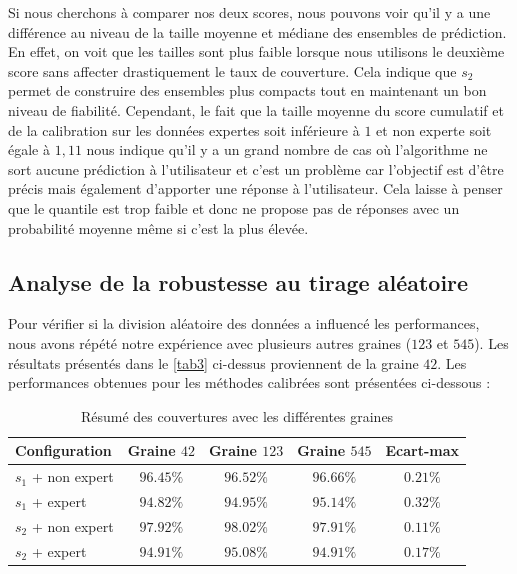 \documentclass[a4paper,12pt]{article}
\begin{document}
\vspace{0.2cm}

Si nous cherchons à comparer nos deux scores, nous pouvons voir qu'il y a une différence au niveau de la taille moyenne et médiane des ensembles de prédiction. En effet, on voit que les tailles sont plus faible lorsque nous utilisons le deuxième score sans affecter drastiquement le taux de couverture. Cela indique que $s_2$ permet de construire des ensembles plus compacts tout en maintenant un bon niveau de fiabilité. Cependant, le fait que la taille moyenne du score cumulatif et de la calibration sur les données expertes soit inférieure à $1$ et non experte soit égale à $1,11$ nous indique qu'il y a un grand nombre de cas où l'algorithme ne sort aucune prédiction à l'utilisateur et c'est un problème car l'objectif est d'être précis mais également d'apporter une réponse à l'utilisateur. Cela laisse à penser que le quantile est trop faible et donc ne propose pas de réponses avec un probabilité moyenne même si c'est la plus élevée.


\subsection{Analyse de la robustesse au tirage aléatoire}

Pour vérifier si la division aléatoire des données a influencé les performances, nous avons répété notre expérience avec plusieurs autres graines ($123$ et $545$). Les résultats présentés dans le \autoref{tab3} ci-dessus proviennent de la graine $42$. Les performances obtenues pour les méthodes calibrées sont présentées ci-dessous :

\begin{table}[h]
    \centering
    \begin{tabular}{|l|c|c|c|c|}
        \hline
        \textbf{Configuration} & \textbf{Graine $42$} & \textbf{Graine $123$} & \textbf{Graine $545$} & \textbf{Ecart-max} \\
        \hline
        $s_1$ + non expert & $96.45\%$ & $96.52\%$ & $96.66\%$ & $0.21\%$ \\
        $s_1$ + expert & $94.82\%$ & $94.95\%$ & $95.14\%$ & $0.32\%$ \\
        $s_2$ + non expert & $97.92\%$ & $98.02\%$ & $97.91\%$ & $0.11\%$ \\
        $s_2$ + expert & $94.91\%$ & $95.08\%$ & $94.91\%$ & $0.17\%$ \\
        \hline
    \end{tabular}
    \caption{Résumé des couvertures avec les différentes graines}
    \label{tab:couvertures_graines}
\end{table}
\end{document}
